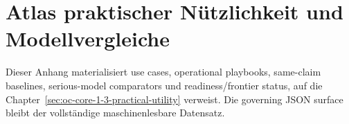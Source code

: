\section{Atlas praktischer Nützlichkeit und Modellvergleiche}
\label{sec:oc-core-1-3-practical-utility-atlas}

Dieser Anhang materialisiert use cases, operational playbooks,
same-claim baselines, serious-model comparators und readiness/frontier status,
auf die Chapter~\ref{sec:oc-core-1-3-practical-utility} verweist. Die
governing JSON surface bleibt der vollständige maschinenlesbare Datensatz.

\begingroup
\footnotesize
\RaggedRight
\setlength{\emergencystretch}{1.2em}
\setlength{\tabcolsep}{2pt}
\setlength{\LTleft}{0pt}
\setlength{\LTright}{0pt}

\endgroup
